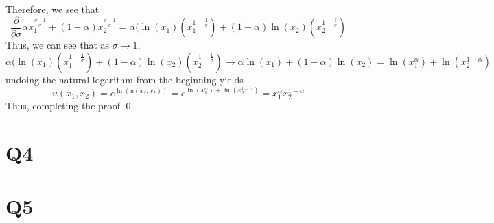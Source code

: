 \documentclass[12pt]{article}
\begin{document}
Therefore, we see that 
\[
    \frac{\partial }{\partial \sigma} \alpha x_1^{\frac{\sigma -1}{\sigma}} + (1-\alpha)x_2^{\frac{\sigma - 1}{\sigma}} =  \alpha(\ln(x_1) \left( x_1^{1-\frac{1}{\sigma}}\right) + (1-\alpha) \ln(x_2) \left( x_2^{1 - \frac{1}{\sigma}} \right) 
\]
Thus, we can see that as $\sigma \to 1$, 
\[
    \alpha(\ln(x_1) \left( x_1^{1-\frac{1}{\sigma}}\right) + (1-\alpha) \ln(x_2) \left( x_2^{1 - \frac{1}{\sigma}} \right) \to \alpha \ln(x_1) + (1-\alpha)\ln(x_2) = \ln(x_1^\alpha) + \ln(x_2^{1-\alpha})
\]
undoing the natural logarithm from the beginning yields
\[
u(x_1,x_2) = e^{\ln(u(x_1,x_2))} = e^{\ln(x_1^\alpha) + \ln(x_2^{1-\alpha})} = x_1^{\alpha} x_2^{1-\alpha}
\]
Thus, completing the proof \qed
\section*{Q4}
\section*{Q5}
\end{document}
